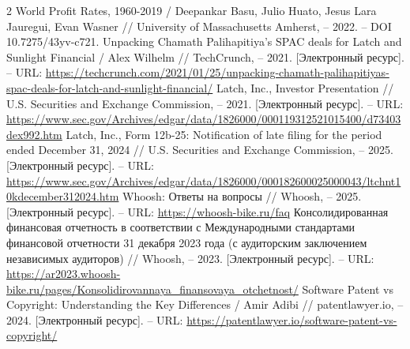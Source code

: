 \documentclass{article}
\begin{document}
\begin{thebibliography}{2}
 World Profit Rates, 1960-2019 / Deepankar Basu, Julio Huato, Jesus Lara Jauregui, Evan Wasner // University of Massachusetts Amherst, – 2022. – DOI 10.7275/43yv-c721.
 Unpacking Chamath Palihapitiya’s SPAC deals for Latch and Sunlight Financial / Alex Wilhelm // TechCrunch, – 2021. [Электронный ресурс]. – URL: \url{https://techcrunch.com/2021/01/25/unpacking-chamath-palihapitiyas-spac-deals-for-latch-and-sunlight-financial/}
 Latch, Inc., Investor Presentation // U.S. Securities and Exchange Commission, – 2021. [Электронный ресурс]. – URL: \url{https://www.sec.gov/Archives/edgar/data/1826000/000119312521015400/d73403dex992.htm}
 Latch, Inc., Form 12b-25: Notification of late filing for the period ended December 31, 2024 // U.S. Securities and Exchange Commission, – 2025. [Электронный ресурс]. – URL: \url{https://www.sec.gov/Archives/edgar/data/1826000/000182600025000043/ltchnt10kdecember312024.htm}
 Whoosh: Ответы на вопросы // Whoosh, – 2025. [Электронный ресурс]. – URL: \url{https://whoosh-bike.ru/faq}
 Консолидированная финансовая отчетность в соответствии с Международными стандартами финансовой отчетности 31 декабря 2023 года (с аудиторским заключением независимых аудиторов) // Whoosh, – 2023. [Электронный ресурс]. – URL: \url{https://ar2023.whoosh-bike.ru/pages/Konsolidirovannaya_finansovaya_otchetnost/}
 Software Patent vs Copyright: Understanding the Key Differences / Amir Adibi // patentlawyer.io, – 2024. [Электронный ресурс]. – URL: \url{https://patentlawyer.io/software-patent-vs-copyright/}
\end{thebibliography} 
\end{document}
